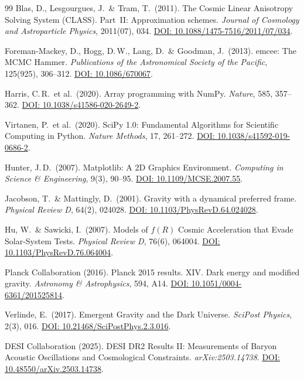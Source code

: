 \documentclass[aps,prd,twocolumn,superscriptaddress,nofootinbib]{revtex4-2}
\begin{document}
\begin{thebibliography}{99}
Blas, D., Lesgourgues, J.\ \& Tram, T.\ (2011).
The Cosmic Linear Anisotropy Solving System (CLASS). Part~II: Approximation schemes.
\textit{Journal of Cosmology and Astroparticle Physics}, 2011(07), 034.
\href{https://doi.org/10.1088/1475-7516/2011/07/034}{DOI: 10.1088/1475-7516/2011/07/034}.

Foreman-Mackey, D., Hogg, D.\,W., Lang, D.\ \& Goodman, J.\ (2013).
emcee: The MCMC Hammer.
\textit{Publications of the Astronomical Society of the Pacific}, 125(925), 306--312.
\href{https://doi.org/10.1086/670067}{DOI: 10.1086/670067}.

Harris, C.\,R.\ et al.\ (2020).
Array programming with NumPy.
\textit{Nature}, 585, 357--362.
\href{https://doi.org/10.1038/s41586-020-2649-2}{DOI: 10.1038/s41586-020-2649-2}.

Virtanen, P.\ et al.\ (2020).
SciPy 1.0: Fundamental Algorithms for Scientific Computing in Python.
\textit{Nature Methods}, 17, 261--272.
\href{https://doi.org/10.1038/s41592-019-0686-2}{DOI: 10.1038/s41592-019-0686-2}.

Hunter, J.\,D.\ (2007).
Matplotlib: A 2D Graphics Environment.
\textit{Computing in Science \& Engineering}, 9(3), 90--95.
\href{https://doi.org/10.1109/MCSE.2007.55}{DOI: 10.1109/MCSE.2007.55}.

Jacobson, T.\ \& Mattingly, D.\ (2001).
Gravity with a dynamical preferred frame.
\textit{Physical Review D}, 64(2), 024028.
\href{https://doi.org/10.1103/PhysRevD.64.024028}{DOI: 10.1103/PhysRevD.64.024028}.

Hu, W.\ \& Sawicki, I.\ (2007).
Models of $f(R)$ Cosmic Acceleration that Evade Solar-System Tests.
\textit{Physical Review D}, 76(6), 064004.
\href{https://doi.org/10.1103/PhysRevD.76.064004}{DOI: 10.1103/PhysRevD.76.064004}.

Planck Collaboration (2016).
Planck 2015 results. XIV. Dark energy and modified gravity.
\textit{Astronomy \& Astrophysics}, 594, A14.
\href{https://doi.org/10.1051/0004-6361/201525814}{DOI: 10.1051/0004-6361/201525814}.

Verlinde, E.\ (2017).
Emergent Gravity and the Dark Universe.
\textit{SciPost Physics}, 2(3), 016.
\href{https://doi.org/10.21468/SciPostPhys.2.3.016}{DOI: 10.21468/SciPostPhys.2.3.016}.

DESI Collaboration (2025).
DESI DR2 Results II: Measurements of Baryon Acoustic Oscillations and Cosmological Constraints.
\textit{arXiv:2503.14738}.
\href{https://doi.org/10.48550/arXiv.2503.14738}{DOI: 10.48550/arXiv.2503.14738}.


\end{thebibliography}
\end{document}

